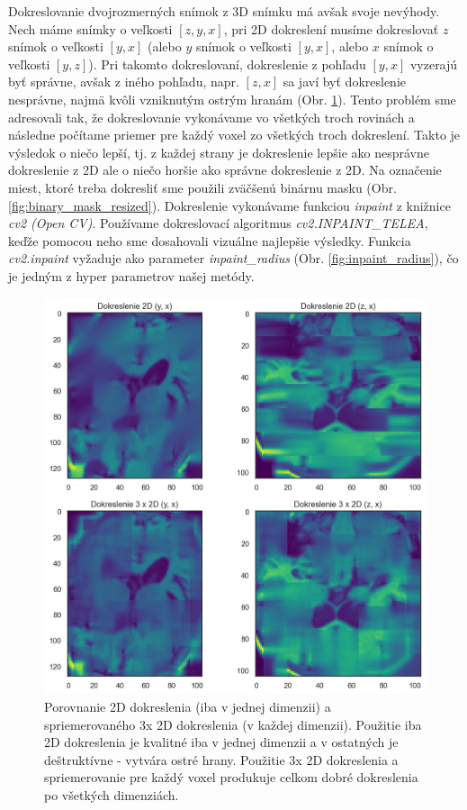 Dokreslovanie dvojrozmerných snímok z 3D snímku má avšak svoje nevýhody. Nech máme snímky o veľkosti $[z, y, x]$, pri 2D dokreslení musíme dokreslovať $z$ snímok o veľkosti $[y, x]$ (alebo $y$ snímok o veľkosti $[y, x]$, alebo $x$ snímok o veľkosti $[y, z]$). Pri takomto dokreslovaní, dokreslenie z pohľadu $[y, x]$ vyzerajú byť správne, avšak z iného pohľadu, napr. $[z, x]$ sa javí byť dokreslenie nesprávne, najmä kvôli vzniknutým ostrým hranám (Obr. \ref{fig:inpaint_3x_2d}). Tento problém sme adresovali tak, že dokreslovanie vykonávame vo všetkých troch rovinách a následne počítame priemer pre každý voxel zo všetkých troch dokreslení. Takto je výsledok o niečo lepší, tj. z každej strany je dokreslenie lepšie ako nesprávne dokreslenie z 2D ale o niečo horšie ako správne dokreslenie z 2D. Na označenie miest, ktoré treba dokresliť sme použili zväčšenú binárnu masku (Obr. \ref{fig:binary_mask_resized}). Dokreslenie vykonávame funkciou \textit{inpaint} z knižnice \textit{cv2 (Open CV)}. Používame dokreslovací algoritmus \textit{cv2.INPAINT\_TELEA}, keďže pomocou neho sme dosahovali vizuálne najlepšie výsledky. Funkcia \textit{cv2.inpaint} vyžaduje ako parameter \textit{inpaint\_radius} (Obr. \ref{fig:inpaint_radius}), čo je jedným z hyper parametrov našej metódy.

\begin{figure}[h!]
    \centering
    \includegraphics[width=13cm]{assets/images/inpaint_3x_2d.png}
    \caption{Porovnanie 2D dokreslenia (iba v jednej dimenzii) a spriemerovaného 3x 2D dokreslenia (v každej dimenzii). Použitie iba 2D dokreslenia je kvalitné iba v jednej dimenzii a v ostatných je deštruktívne - vytvára ostré hrany. Použitie 3x 2D dokreslenia a spriemerovanie pre každý voxel produkuje celkom dobré dokreslenia po všetkých dimenziách.}
    \label{fig:inpaint_3x_2d}
\end{figure}

